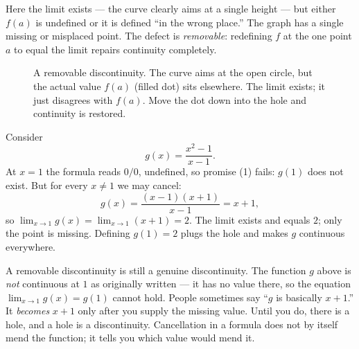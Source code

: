Here the limit exists --- the curve clearly aims at a single height --- but either $f(a)$
is undefined or it is defined ``in the wrong place.'' The graph has a single missing or
misplaced point. The defect is \emph{removable}: redefining $f$ at the one point $a$ to
equal the limit repairs continuity completely.

\begin{figure}[H]
\centering
{}
\caption{A removable discontinuity. The curve aims at the open circle, but the actual
value $f(a)$ (filled dot) sits elsewhere. The limit exists; it just disagrees with
$f(a)$. Move the dot down into the hole and continuity is restored.}
\label{ch08:fig-removable}
\end{figure}

\begin{example}
\label{ch08:ex-hole}
Consider
\[
  g(x)=\frac{x^2-1}{x-1}.
\]
At $x=1$ the formula reads $0/0$, undefined, so promise (1) fails: $g(1)$ does not exist.
But for every $x\ne 1$ we may cancel:
\[
  g(x)=\frac{(x-1)(x+1)}{x-1}=x+1,
\]
so $\lim_{x\to 1} g(x)=\lim_{x\to 1}(x+1)=2$. The limit exists and equals $2$; only the
point is missing. Defining $g(1)=2$ plugs the hole and makes $g$ continuous everywhere.
\end{example}

\begin{trapbox}
A removable discontinuity is still a genuine discontinuity. The function $g$ above is
\emph{not} continuous at $1$ as originally written --- it has no value there, so the
equation $\lim_{x\to 1}g(x)=g(1)$ cannot hold. People sometimes say ``$g$ is basically
$x+1$.'' It \emph{becomes} $x+1$ only after you supply the missing value. Until you do,
there is a hole, and a hole is a discontinuity. Cancellation in a formula does not by
itself mend the function; it tells you which value would mend it.
\end{trapbox}

